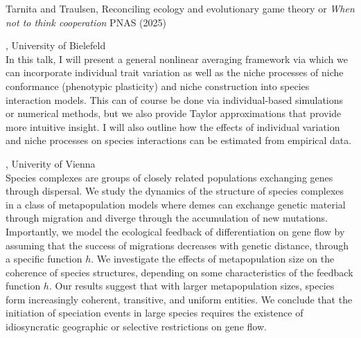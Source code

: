 \documentclass[12pt,a4paper]{article}
\begin{document}
 Tarnita and Traulsen, Reconciling ecology and evolutionary game theory or {\em When not to think cooperation} PNAS (2025) 

\bigskip\bigskip

, University of Bielefeld \\[2ex] In this talk, I will present a general nonlinear averaging framework via which we can incorporate individual trait variation as well as the niche processes of niche conformance (phenotypic plasticity) and niche construction into species interaction models. This can of course be done via individual-based simulations or numerical methods, but we also provide Taylor approximations that provide more intuitive insight. I will also outline how the effects of individual variation and niche processes on species interactions can be estimated from empirical data. 

\bigskip\bigskip

, Univerity of Vienna \\[2ex] Species complexes are groups of closely related populations exchanging genes through dispersal. We study the dynamics of the structure of species complexes in a class of metapopulation models where demes can exchange genetic material through migration and diverge through the accumulation of new mutations. Importantly, we model the ecological feedback of differentiation on gene flow by assuming that the success of migrations decreases with genetic distance, through a specific function $h$. We investigate the effects of  metapopulation size on the coherence of species structures, depending on some characteristics of the feedback function $h$. Our results suggest that with larger metapopulation sizes, species form increasingly coherent, transitive, and uniform entities.  We conclude that the initiation of speciation events in large species requires the existence of idiosyncratic geographic or selective restrictions on gene flow. 

\bigskip\bigskip
\end{document}
